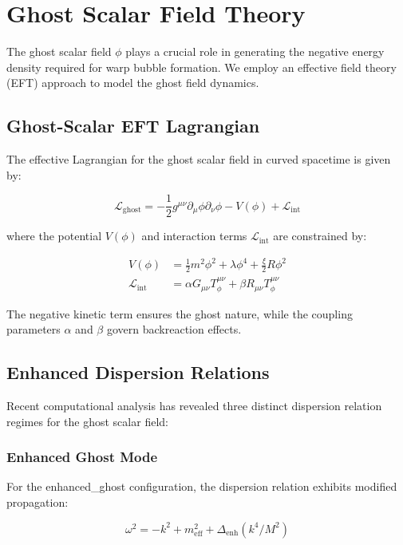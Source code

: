 \section{Ghost Scalar Field Theory}

The ghost scalar field $\phi$ plays a crucial role in generating the negative energy density required for warp bubble formation. We employ an effective field theory (EFT) approach to model the ghost field dynamics.

\subsection{Ghost-Scalar EFT Lagrangian}

The effective Lagrangian for the ghost scalar field in curved spacetime is given by:

\begin{equation}
\mathcal{L}_{\text{ghost}} = -\frac{1}{2}g^{\mu\nu}\partial_\mu\phi\partial_\nu\phi - V(\phi) + \mathcal{L}_{\text{int}}
\end{equation}

where the potential $V(\phi)$ and interaction terms $\mathcal{L}_{\text{int}}$ are constrained by:

\begin{align}
V(\phi) &= \frac{1}{2}m^2\phi^2 + \lambda\phi^4 + \frac{\xi}{2}R\phi^2 \\
\mathcal{L}_{\text{int}} &= \alpha G_{\mu\nu}T^{\mu\nu}_{\phi} + \beta R_{\mu\nu}T^{\mu\nu}_{\phi}
\end{align}

The negative kinetic term ensures the ghost nature, while the coupling parameters $\alpha$ and $\beta$ govern backreaction effects.

\subsection{Enhanced Dispersion Relations}

Recent computational analysis has revealed three distinct dispersion relation regimes for the ghost scalar field:

\subsubsection{Enhanced Ghost Mode}
For the enhanced_ghost configuration, the dispersion relation exhibits modified propagation:

\begin{equation}
\omega^2 = -k^2 + m_{\text{eff}}^2 + \Delta_{\text{enh}}(k^4/M^2)
\end{equation}

